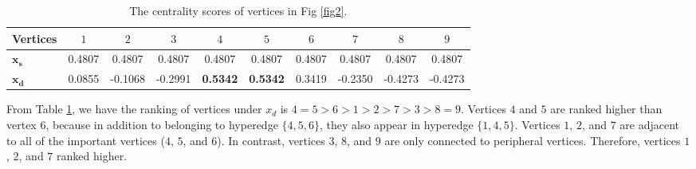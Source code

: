 \documentclass[preprint,12pt]{elsarticle}
\begin{document}
\begin{spacing}{1.15}
\begin{table}[h]
    \tiny
    \centering
    \caption{The centrality scores of vertices in Fig \ref{fig2}.}
    \label{table4}
    \begin{tabular}{lccccccccc}  %
    \toprule
    \textbf{Vertices} & \textbf{$1$} & \textbf{$2$} & \textbf{$3$} & \textbf{$4$} & \textbf{$5$} & \textbf{$6$}& \textbf{$7$}& \textbf{$8$}& \textbf{$9$} \\ \midrule
    \textbf{$\boldsymbol{x_s}$}  & 0.4807 & 0.4807 & 0.4807 & 0.4807 &0.4807 & 0.4807 & 0.4807 & 0.4807 & 0.4807 \\
    \textbf{$\boldsymbol{x_d}$} & 0.0855 & -0.1068 &-0.2991 & \textbf{0.5342} & \textbf{0.5342} & 0.3419 & -0.2350 &-0.4273 & -0.4273\\
    \bottomrule
    \end{tabular}
\end{table}

From Table \ref{table4}, we have the ranking of vertices under $x_d$ is $4=5>6>1>2>7>3>8=9$.
Vertices $4$ and $5$ are ranked higher than vertex $6$, because in addition to belonging to hyperedge $\{4, 5, 6\}$, they also appear in hyperedge $\{1, 4, 5\}$.
Vertices $1$, $2$, and $7$ are adjacent to all of the important vertices ($4$, $5$, and $6$). In contrast, vertices $3$, $8$, and $9$ are only connected to peripheral vertices. Therefore, vertices $1$, $2$, and $7$ ranked higher.


\end{spacing}
\end{document}
